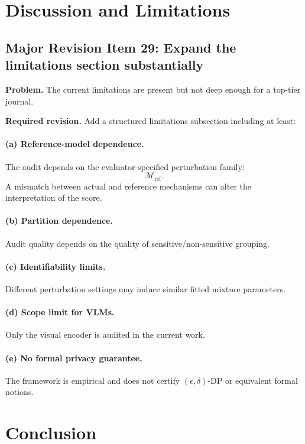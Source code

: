 \section{Discussion and Limitations}

\subsection*{Major Revision Item 29: Expand the limitations section substantially}
\textbf{Problem.} The current limitations are present but not deep enough for a top-tier journal.

\textbf{Required revision.}
Add a structured limitations subsection including at least:

\paragraph{(a) Reference-model dependence.}
The audit depends on the evaluator-specified perturbation family:
\[
\mathcal{M}_{\mathrm{ref}}.
\]
A mismatch between actual and reference mechanisms can alter the interpretation of the score.

\paragraph{(b) Partition dependence.}
Audit quality depends on the quality of sensitive/non-sensitive grouping.

\paragraph{(c) Identifiability limits.}
Different perturbation settings may induce similar fitted mixture parameters.

\paragraph{(d) Scope limit for VLMs.}
Only the visual encoder is audited in the current work.

\paragraph{(e) No formal privacy guarantee.}
The framework is empirical and does not certify $(\epsilon,\delta)$-DP or equivalent formal notions.

\section{Conclusion}

